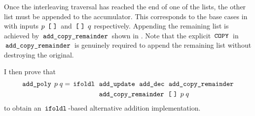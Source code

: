 Once the interleaving traversal has reached the end of one of the lists, the other list must be appended to the accumulator.
This corresponds to the base cases in  with inputs $p \; \,\text{\ttfamily [\;]}\,$ and $\,\text{\ttfamily [\;]}\, \; q$ respectively.
Appending the remaining list is achieved by $\,\text{\ttfamily add\_copy\_remainder}\,$ shown in .
Note that the explicit $\,\text{\ttfamily COPY}\,$ in $\,\text{\ttfamily add\_copy\_remainder}\,$ is genuinely required to append the remaining list without destroying the original.

I then prove that
\begin{align*}
	\,\text{\ttfamily add\_poly}\, \; p \; q = \,\text{\ttfamily ifoldl}\, & \; \,\text{\ttfamily add\_update}\, \; \,\text{\ttfamily add\_dec}\, \; \,\text{\ttfamily add\_copy\_remainder}\, \\
	                                               & \; \,\text{\ttfamily add\_copy\_remainder}\, \; \,\text{\ttfamily [\;]}\, \; p \; q
\end{align*}
to obtain an $\,\text{\ttfamily ifoldl}\,$-based alternative addition implementation.


